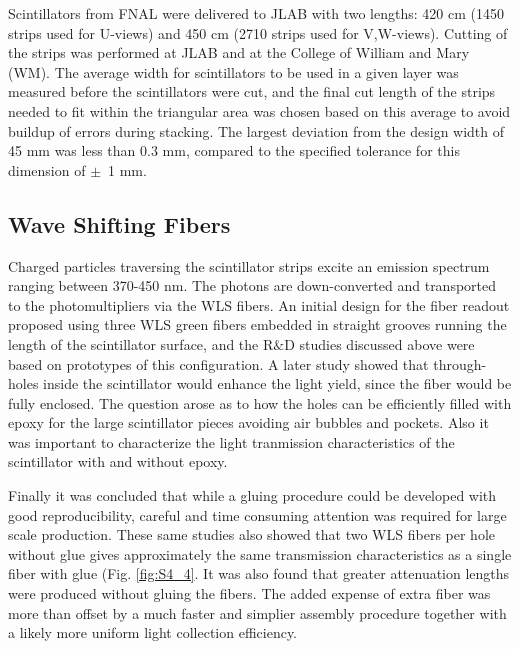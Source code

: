 Scintillators from FNAL were delivered to JLAB with two lengths: 420 cm (1450 strips used for U-views) and 450 cm (2710 strips used for V,W-views).   Cutting of the strips was performed at JLAB and at the College of William and Mary (WM). The average width for scintillators to be used in a given layer was measured before the scintillators were cut, and the final cut length of the strips needed to fit within the triangular area was chosen based on this average to avoid buildup of errors during stacking.  The largest deviation from the design width of 45 mm was less than 0.3 mm, compared to the specified  tolerance for this dimension of $\pm$~1 mm.

\subsection{Wave Shifting Fibers}
Charged particles traversing the scintillator strips excite an emission spectrum ranging between 370-450 nm. The photons are down-converted and transported to the photomultipliers via the WLS fibers. An initial design for the fiber readout proposed using three WLS green fibers embedded in straight grooves running the length of the scintillator surface, and the R$\&$D studies discussed above \cite{2007007} were based on prototypes of this configuration.  A later study \cite{2009018} showed that through-holes inside the scintillator would enhance the light yield, since the fiber would be fully enclosed. The question arose as to how the holes can be efficiently filled with epoxy for the large scintillator pieces avoiding air bubbles and pockets. Also it was important to characterize the light tranmission characteristics of the scintillator with and without epoxy.

Finally it was concluded \cite{2010012} that while a gluing procedure could be developed with good reproducibility, careful and time consuming attention was required for large scale production.  These same studies also showed that two WLS fibers per hole without glue gives approximately the same transmission characteristics as a single fiber with glue (Fig. \ref{fig:S4_4}.  It was also found that greater attenuation lengths were produced without gluing the fibers. The added expense of extra fiber was more than offset by a much faster and simplier assembly procedure together with a likely more uniform light collection efficiency. 

